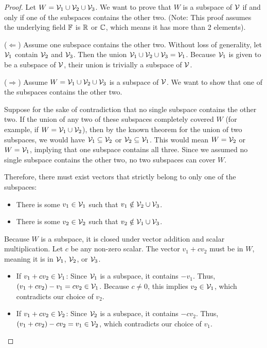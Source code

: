 \begin{proof}
	Let $W = \mathcal{V}_1 \cup \mathcal{V}_2 \cup \mathcal{V}_3$. We want to prove that $W$ is a subspace of $\mathcal{V}$ if and only if one of the subspaces contains the other two. (Note: This proof assumes the underlying field $\mathbb{F}$ is $\mathbb{R}$ or $\mathbb{C}$, which means it has more than 2 elements).
	
	($\Leftarrow$) Assume one subspace contains the other two. Without loss of generality, let $\mathcal{V}_1$ contain $\mathcal{V}_2$ and $\mathcal{V}_3$. Then the union $\mathcal{V}_1 \cup \mathcal{V}_2 \cup \mathcal{V}_3 = \mathcal{V}_1$. Because $\mathcal{V}_1$ is given to be a subspace of $\mathcal{V}$, their union is trivially a subspace of $\mathcal{V}$.
	
	($\Rightarrow$) Assume $W = \mathcal{V}_1 \cup \mathcal{V}_2 \cup \mathcal{V}_3$ is a subspace of $\mathcal{V}$. We want to show that one of the subspaces contains the other two. 
	
	Suppose for the sake of contradiction that no single subspace contains the other two. 
	If the union of any two of these subspaces completely covered $W$ (for example, if $W = \mathcal{V}_1 \cup \mathcal{V}_2$), then by the known theorem for the union of two subspaces, we would have $\mathcal{V}_1 \subseteq \mathcal{V}_2$ or $\mathcal{V}_2 \subseteq \mathcal{V}_1$. This would mean $W = \mathcal{V}_2$ or $W = \mathcal{V}_1$, implying that one subspace contains all three. 
	Since we assumed no single subspace contains the other two, no two subspaces can cover $W$. 
	
	Therefore, there must exist vectors that strictly belong to only one of the subspaces:
	\begin{itemize}
		\item There is some $v_1 \in \mathcal{V}_1$ such that $v_1 \notin \mathcal{V}_2 \cup \mathcal{V}_3$.
		\item There is some $v_2 \in \mathcal{V}_2$ such that $v_2 \notin \mathcal{V}_1 \cup \mathcal{V}_3$.
	\end{itemize}
	
	Because $W$ is a subspace, it is closed under vector addition and scalar multiplication. Let $c$ be any non-zero scalar. The vector $v_1 + c v_2$ must be in $W$, meaning it is in $\mathcal{V}_1$, $\mathcal{V}_2$, or $\mathcal{V}_3$.
	\begin{itemize}
		\item If $v_1 + c v_2 \in \mathcal{V}_1$: Since $\mathcal{V}_1$ is a subspace, it contains $-v_1$. Thus, $(v_1 + c v_2) - v_1 = c v_2 \in \mathcal{V}_1$. Because $c \neq 0$, this implies $v_2 \in \mathcal{V}_1$, which contradicts our choice of $v_2$.
		\item If $v_1 + c v_2 \in \mathcal{V}_2$: Since $\mathcal{V}_2$ is a subspace, it contains $-cv_2$. Thus, $(v_1 + c v_2) - c v_2 = v_1 \in \mathcal{V}_2$, which contradicts our choice of $v_1$.
	\end{itemize}
	

\end{proof}
